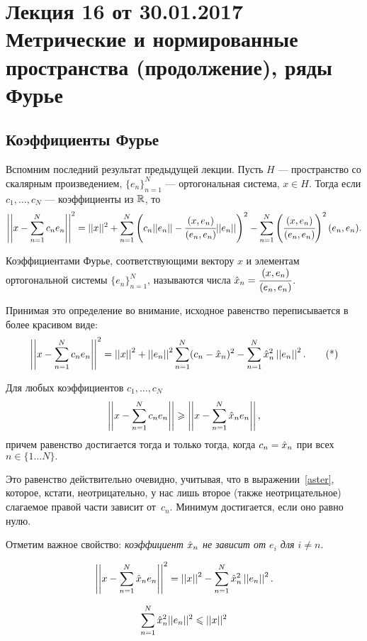 \section{Лекция 16 от 30.01.2017 \\ Метрические и нормированные пространства (продолжение), ряды Фурье}
\subsection{Коэффициенты Фурье}
Вспомним последний результат предыдущей лекции. Пусть $H$ --- пространство со скалярным произведением, $\{e_n\}_{n=1}^{N}$ --- ортогональная система, $x \in H$. Тогда если $c_1, \ldots, c_N$ --- коэффициенты из $\mathbb{R}$, то 
\begin{gather*}
    \left|\left|x - \sum\limits_{n= 1}^{N}c_ne_n\right|\right|^2 = ||x||^2 +\sum\limits_{n=1}^{N}\left(c_n||e_n|| - \cfrac{(x, e_n)}{(e_n, e_n)}||e_n||\right)^2 - \sum\limits_{n =1 }^{N} \left(\cfrac{(x, e_n)}{(e_n, e_n)}\right)^2(e_n, e_n).
\end{gather*}
\begin{Def}
    Коэффициентами Фурье, соответствующими вектору $x$ и элементам ортогональной системы $\{e_n\}_{n=1}^{N}$, называются числа $\hat{x}_n = \cfrac{(x, e_n)}{(e_n, e_n)}$.
\end{Def}
Принимая это определение во внимание, исходное равенство переписывается в более красивом виде:
\[
    \left|\left|x - \sum\limits_{n= 1}^{N}c_ne_n\right|\right|^2 = \left|\left|x\right|\right|^2 + \left|\left|e_n\right|\right|^2 \sum\limits_{n=1}^{N}(c_n - \hat{x}_n)^2 - \sum\limits_{n =1}^{N}\hat{x}_n^2 
    \left|\left|e_n\right|\right|^2. \tag{*}\label{aster}
\]
\begin{Statement}[очевидное]
    Для любых коэффициентов $c_1, \ldots, c_N$
    $$
        \left|\left| x - \sum\limits_{n=1}^{N}c_n e_n\right|\right|\geqslant \left|\left|x -  \sum\limits_{n=1}^{N}\hat{x}_n e_n\right|\right|,
    $$
    причем равенство достигается тогда и только тогда, когда $c_n = \hat{x}_n$ при всех $n\in \{1\dots N\}.$
\end{Statement}
Это равенство действительно очевидно, учитывая, что в выражении~\eqref{aster}, которое, кстати, неотрицательно, у нас лишь второе (также неотрицательное) слагаемое правой части зависит от~$c_n$. Минимум достигается, если оно равно нулю.

Отметим важное свойство: \textit{коэффициент $\hat{x}_n$ не зависит от $e_i$ для $i \neq n$}.
\begin{Statement}
    $$
        \left|\left|x - \sum\limits_{n=1}^{N}\hat{x}_ne_n\right|\right|^2 = \left|\left|x\right|\right|^2 - \sum\limits_{n=1}^{N} \hat{x}_n^2 \left|\left|e_n\right|\right|^2.
    $$
\end{Statement}
\begin{Consequence}
    $$\sum\limits_{n=1}^{N} \hat{x}_n^2||e_n||^2\leqslant ||x||^2$$
\end{Consequence}
